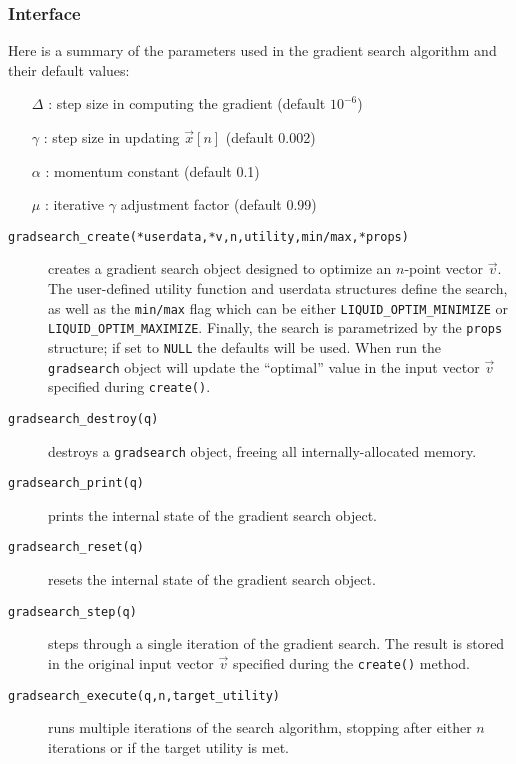 \subsubsection{Interface}
Here is a summary of the parameters used in the gradient search algorithm and
their default values:
\begin{itemize}
\item[$\Delta$] : step size in computing the gradient (default $10^{-6}$)
\item[$\gamma$] : step size in updating $\vec{x}[n]$ (default 0.002)
\item[$\alpha$] : momentum constant (default 0.1)
\item[$\mu$]    : iterative $\gamma$ adjustment factor (default 0.99)
\end{itemize}
%
\begin{description}
\item[{\tt gradsearch\_create(*userdata,*v,n,utility,min/max,*props)}]
    creates a gradient search object designed to optimize an $n$-point
    vector $\vec{v}$.
    The user-defined utility function and userdata structures define the
    search, as well as the {\tt min/max} flag which can be either
    {\tt LIQUID\_OPTIM\_MINIMIZE} or
    {\tt LIQUID\_OPTIM\_MAXIMIZE}.
    Finally, the search is parametrized by the {\tt props} structure;
    if set to {\tt NULL} the defaults will be used.
    When run the {\tt gradsearch} object will update the ``optimal''
    value in the input vector $\vec{v}$ specified during
    {\tt create()}.
\item[{\tt gradsearch\_destroy(q)}]
    destroys a {\tt gradsearch} object, freeing all internally-allocated
    memory.
\item[{\tt gradsearch\_print(q)}]
    prints the internal state of the gradient search object.
\item[{\tt gradsearch\_reset(q)}]
    resets the internal state of the gradient search object.
\item[{\tt gradsearch\_step(q)}]
    steps through a single iteration of the gradient search.
    The result is stored in the original input vector $\vec{v}$
    specified during the {\tt create()} method.
\item[{\tt gradsearch\_execute(q,n,target\_utility)}]
    runs multiple iterations of the search algorithm,
    stopping after either $n$ iterations or if the target utility is
    met.
\end{description}
